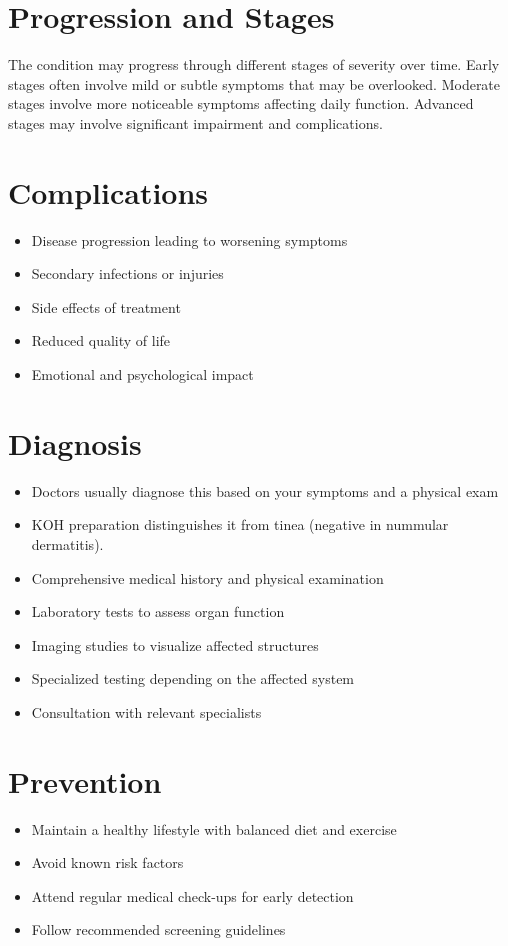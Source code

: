 \section{Progression and Stages}
The condition may progress through different stages of severity over time. Early stages often involve mild or subtle symptoms that may be overlooked. Moderate stages involve more noticeable symptoms affecting daily function. Advanced stages may involve significant impairment and complications.
\section{Complications}
\begin{itemize}[noitemsep]
  \item Disease progression leading to worsening symptoms
  \item Secondary infections or injuries
  \item Side effects of treatment
  \item Reduced quality of life
  \item Emotional and psychological impact
\end{itemize}
\section{Diagnosis}
\begin{itemize}[noitemsep]
  \item Doctors usually diagnose this based on your symptoms and a physical exam
  \item KOH preparation distinguishes it from tinea (negative in nummular dermatitis).
  \item Comprehensive medical history and physical examination
  \item Laboratory tests to assess organ function
  \item Imaging studies to visualize affected structures
  \item Specialized testing depending on the affected system
  \item Consultation with relevant specialists
\end{itemize}
\section{Prevention}
\begin{itemize}[noitemsep]
  \item Maintain a healthy lifestyle with balanced diet and exercise
  \item Avoid known risk factors
  \item Attend regular medical check-ups for early detection
  \item Follow recommended screening guidelines
\end{itemize}
